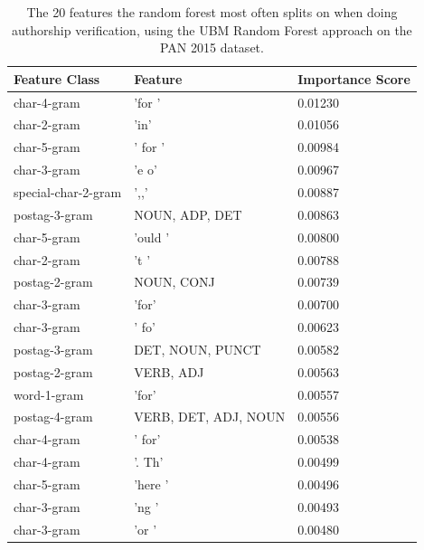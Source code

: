 \begin{table}
    \centering
    \begin{tabular}{lll}
        \textbf{Feature Class} & \textbf{Feature}     & \textbf{Importance Score} \\
        \hline
        char-4-gram            & 'for '               & 0.01230                   \\
        char-2-gram            & 'in'                 & 0.01056                   \\
        char-5-gram            & ' for '              & 0.00984                   \\
        char-3-gram            & 'e o'                & 0.00967                   \\
        special-char-2-gram    & ',,'                 & 0.00887                   \\
        postag-3-gram          & NOUN, ADP, DET       & 0.00863                   \\
        char-5-gram            & 'ould '              & 0.00800                   \\
        char-2-gram            & 't '                 & 0.00788                   \\
        postag-2-gram          & NOUN, CONJ           & 0.00739                   \\
        char-3-gram            & 'for'                & 0.00700                   \\
        char-3-gram            & ' fo'                & 0.00623                   \\
        postag-3-gram          & DET, NOUN, PUNCT     & 0.00582                   \\
        postag-2-gram          & VERB, ADJ            & 0.00563                   \\
        word-1-gram            & 'for'                & 0.00557                   \\
        postag-4-gram          & VERB, DET, ADJ, NOUN & 0.00556                   \\
        char-4-gram            & ' for'               & 0.00538                   \\
        char-4-gram            & '. Th'               & 0.00499                   \\
        char-5-gram            & 'here '              & 0.00496                   \\
        char-3-gram            & 'ng '                & 0.00493                   \\
        char-3-gram            & 'or '                & 0.00480
    \end{tabular}
    \caption{The 20 features the random forest most often splits on when doing
    authorship verification, using the \gls{UBM} Random Forest approach on the
    PAN 2015 dataset.}
    \label{tab:feature_importance}
\end{table}

